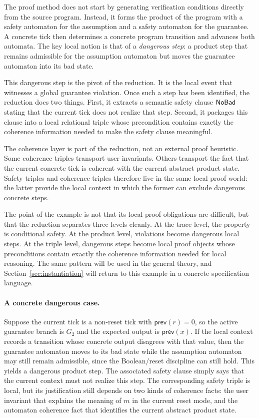\documentclass[acmsmall,screen]{acmart}
\theoremstyle{leftplain}
\theoremstyle{leftdefinition}
\theoremstyle{leftremark}
\begin{document}
The proof method does not start by generating verification conditions directly
from the source program. Instead, it forms the product of the program with a
safety automaton for the assumption and a safety automaton for the guarantee. A
concrete tick then determines a concrete program transition and advances both
automata. The key local notion is that of a \emph{dangerous step}: a product
step that remains admissible for the assumption automaton but moves the
guarantee automaton into its bad state.

This dangerous step is the pivot of the reduction. It is the local event that
witnesses a global guarantee violation. Once such a step has been identified,
the reduction does two things. First, it extracts a semantic safety clause
$\mathsf{NoBad}$ stating that the current tick does not realize that step. Second, it
packages this clause into a local relational triple whose precondition
contains exactly the coherence information needed to make the safety clause
meaningful.

The coherence layer is part of the reduction, not an external proof heuristic.
Some coherence triples transport user invariants. Others transport the fact
that the current concrete tick is coherent with the current abstract product
state. Safety triples and coherence triples therefore live in the same local
proof world: the latter provide the local context in which the former can
exclude dangerous concrete steps.

The point of the example is not that its local proof obligations are difficult,
but that the reduction separates three levels cleanly. At the trace level, the
property is conditional safety. At the product level, violations become
dangerous local steps. At the triple level, dangerous steps become local proof
objects whose preconditions contain exactly the coherence information needed
for local reasoning. The same pattern will be used in the general theory, and
Section~\ref{sec:instantiation} will return to this example in a concrete
specification language.

\paragraph{A concrete dangerous case.}
Suppose the current tick is a non-reset tick with $\mathsf{prev}(r) = 0$, so
the active guarantee branch is $G_2$ and the expected output is
$\mathsf{prev}(x)$. If the local context records a transition whose concrete
output disagrees with that value, then the guarantee automaton moves to its bad
state while the assumption automaton may still remain admissible, since the
Boolean/reset discipline can still hold. This yields a dangerous product step.
The associated safety clause simply says that the current context must not
realize this step. The corresponding safety triple is local, but its
justification still depends on two kinds of coherence facts: the user
invariant that explains the meaning of $m$ in the current reset mode, and the
automaton coherence fact that identifies the current abstract product state.
\end{document}
